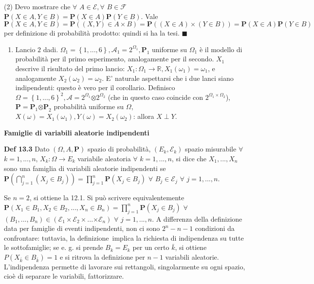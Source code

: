 \documentclass{article}
\begin{document}
(2) Devo mostrare che $\forall $ $A\in \mathcal{E},\forall $ $B\in \mathcal{F%
}$ $\mathbf{P}\left( X\in A,Y\in B\right) =\mathbf{P}\left( X\in A\right) 
\mathbf{P}\left( Y\in B\right) $. Vale $\mathbf{P}\left( X\in A,Y\in
B\right) =\mathbf{P}\left( \left( X,Y\right) \in A\times B\right) =\mathbf{P}%
\left( \left( X\in A\right) \times \left( Y\in B\right) \right) =\mathbf{P}%
\left( X\in A\right) \mathbf{P}\left( Y\in B\right) $ per definizione di
probabilit\`{a} prodotto: quindi si ha la tesi. $\blacksquare $

\begin{enumerate}
\item Lancio $2$ dadi. $\Omega _{1}=\left\{ 1,...,6\right\} ,\mathcal{A}%
_{1}=2^{\Omega _{1}},\mathbf{P}_{1}$ uniforme su $\Omega _{1}$ \`{e} il
modello di probabilit\`{a} per il primo esperimento, analogamente per il
secondo. $X_{1}$ descrive il risultato del primo lancio: $X_{1}:\Omega
_{1}\rightarrow 
\mathbb{R}
,X_{1}\left( \omega _{1}\right) =\omega _{1}$, e analogamente $X_{2}\left(
\omega _{2}\right) =\omega _{2}$. E' naturale aspettarsi che i due lanci
siano indipendenti: questo \`{e} vero per il corollario. Definisco $\Omega
=\left\{ 1,...,6\right\} ^{2},\mathcal{A=}2^{\Omega _{1}}\mathcal{\otimes }%
2^{\Omega _{2}}$ (che in questo caso coincide con $2^{\Omega _{1}\times
\Omega _{2}}$), $\mathbf{P=P}_{1}\mathbf{\otimes P}_{2}$ probabilit\`{a}
uniforme su $\Omega $, $X\left( \omega \right) =X_{1}\left( \omega
_{1}\right) ,Y\left( \omega \right) =X_{2}\left( \omega _{2}\right) $:
allora $X\perp Y$.
\end{enumerate}

\textbf{Famiglie di variabili aleatorie indipendenti}

\textbf{Def 13.3} Dato $\left( \Omega ,A,\mathbf{P}\right) $ spazio di
probabilit\`{a}, $\left( E_{k},\mathcal{E}_{k}\right) $ spazio misurabile $%
\forall $ $k=1,...,n$, $X_{k}:\Omega \rightarrow E_{k}$ variabile aleatoria $%
\forall $ $k=1,...,n$, si dice che $X_{1},...,X_{n}$ sono una famiglia di
variabili aleatorie indipendenti se $\mathbf{P}\left(
\bigcap_{j=1}^{n}\left( X_{j}\in B_{j}\right) \right) =\prod_{j=1}^{n}%
\mathbf{P}\left( X_{j}\in B_{j}\right) $ $\forall $ $B_{j}\in \mathcal{E}%
_{j} $ $\forall $ $j=1,...,n$.

Se $n=2$, si ottiene la 12.1. Si pu\`{o} scrivere equivalentemente $\mathbf{P%
}\left( X_{1}\in B_{1},X_{2}\in B_{2},...,X_{n}\in B_{n}\right)
=\prod_{j=1}^{n}\mathbf{P}\left( X_{j}\in B_{j}\right) $ $\forall $ $\left(
B_{1},...,B_{n}\right) \in \left( \mathcal{E}_{1}\times \mathcal{E}%
_{2}\times ...\mathcal{\times E}_{n}\right) $ $\forall $ $j=1,...,n$. A
differenza della definizione data per famiglie di eventi indipendenti, non
ci sono $2^{n}-n-1$ condizioni da confrontare: tuttavia, la definizione\
implica la richiesta di indipendenza su tutte le sottofamiglie; se e. g. si
prende $B_{k}=E_{k}$ per un certo $\bar{k}$, si ottiene $P\left( X_{\bar{k}%
}\in B_{\bar{k}}\right) =1$ e si ritrova la definizione per $n-1$ variabili
aleatorie. L'indipendenza permette di lavorare sui rettangoli, singolarmente
su ogni spazio, cio\`{e} di separare le variabili, fattorizzare.
\end{document}
